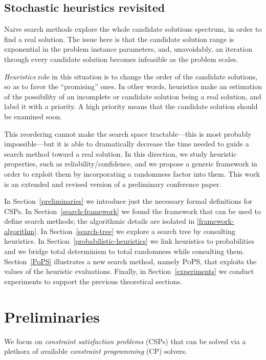 \documentclass{ws-ijait}
\begin{document}
\subsection{Stochastic heuristics revisited}

Naive search methods explore the whole candidate solutions
spectrum, in order to find a real solution. The issue here
is that the candidate solution range is exponential in the
problem instance parameters, and, unavoidably, an iteration
through every candidate solution becomes infeasible as the
problem scales.

\emph{Heuristics} role in this situation is to change the
order of the candidate solutions, so as to favor the
``promising'' ones. In other words, heuristics make an
estimation of the possibility of an incomplete or candidate
solution being a real solution, and label it with a
priority. A high priority means that the candidate solution
should be examined soon.

This reordering cannot make the search space
tractable---this is most probably
impossible\cite{Fortnow2009}---but it is able to
dramatically decrease the time needed to guide a search
method toward a real solution. In this direction, we study
heuristic properties, such as reliability\slash confidence,
and we propose a generic framework in order to exploit them
by incorporating a randomness factor into them. This work is
an extended and revised version of a preliminary conference
paper.\cite{Pothitos2016-PoPS}

In Section~\ref{preliminaries} we introduce just the
necessary formal definitions for CSPs. In
Section~\ref{search-framework} we found the framework that
can be used to define search methods; the algorithmic
details are isolated in \ref{framework-algorithm}. In
Section~\ref{search-tree} we explore a search tree by
consulting heuristics. In
Section~\ref{probabilistic-heuristics} we link heuristics
to probabilities and we bridge total determinism to total
randomness while consulting them. Section~\ref{PoPS}
illustrates a new search method, namely \textsc{PoPS}, that
exploits the values of the heuristic evaluations. Finally,
in Section~\ref{experiments} we conduct experiments to
support the previous theoretical sections.


\section{Preliminaries\label{preliminaries}}

We focus on \emph{constraint satisfaction problems}
(CSPs)\cite{Tsang2014} that can be solved via a plethora of
available \emph{constraint programming} (CP)
solvers.\cite{ECLiPSe2017,Ilog2017}
\end{document}
